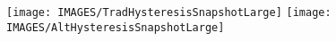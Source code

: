 \documentclass[12pt,letterpaper]{article} %
\begin{document}
\thispagestyle{empty}




\setcounter{figure}{3}
\begin{figure}[!ht]
\centering
\texttt{[image: IMAGES/TradHysteresisSnapshotLarge]}
\texttt{[image: IMAGES/AltHysteresisSnapshotLarge]}
\caption{
}
\label{HysteresisSnapshot}
\end{figure}
\end{document}
